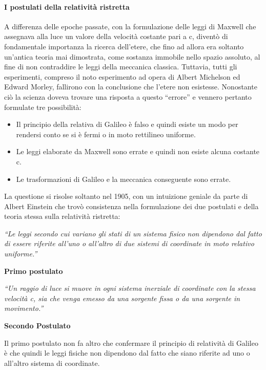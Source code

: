 \documentclass[a4paper,12pt]{report}
\begin{document}
\paragraph{I postulati della relatività ristretta}
A differenza delle epoche passate, con la formulazione delle leggi di Maxwell che assegnava alla luce un valore della velocità costante pari a c, diventò di fondamentale importanza la ricerca dell’etere, che fino ad allora era soltanto un’antica teoria mai dimostrata, come sostanza immobile nello spazio assoluto, al fine di non contraddire le leggi della meccanica classica.
Tuttavia, tutti gli esperimenti, compreso il noto esperimento ad opera di Albert Michelson ed Edward Morley, fallirono con la conclusione che l’etere non esistesse. 
Nonostante ciò la scienza doveva trovare una risposta a questo “errore” e vennero pertanto formulate tre possibilità: 
\begin{itemize}
\item Il principio della relativa di Galileo è falso e quindi esiste un modo per rendersi conto se si è fermi o in moto rettilineo uniforme.
\item Le leggi elaborate da Maxwell sono errate e quindi non esiste alcuna costante c.
\item Le trasformazioni di Galileo e la meccanica conseguente sono errate.
\end{itemize}
\medskip
La questione si risolse soltanto nel 1905, con un intuizione geniale da parte di Albert Einstein che trovò consistenza nella formulazione dei due postulati  e della teoria stessa sulla relatività ristretta\cite{einstein}: \\ 

\setlength{\epigraphwidth}{0.8\textwidth}
\epigraph{\textit{“Le leggi secondo cui variano gli stati di un sistema fisico non dipendono dal fatto di essere riferite all’uno o all’altro di due sistemi di coordinate in moto relativo uniforme.”}}{\textbf{Primo postulato}}

\setlength{\epigraphwidth}{0.8\textwidth}
\epigraph{\textit{“Un raggio di luce si muove in ogni sistema inerziale di coordinate con la stessa velocità c, sia che venga emesso da una sorgente fissa o da una sorgente in movimento.”}}{\textbf{Secondo Postulato}}

Il primo postulato non fa altro che confermare il principio di relatività di Galileo è che quindi le leggi fisiche non dipendono dal fatto che siano riferite ad uno o all’altro sistema di coordinate.\\
\end{document}

